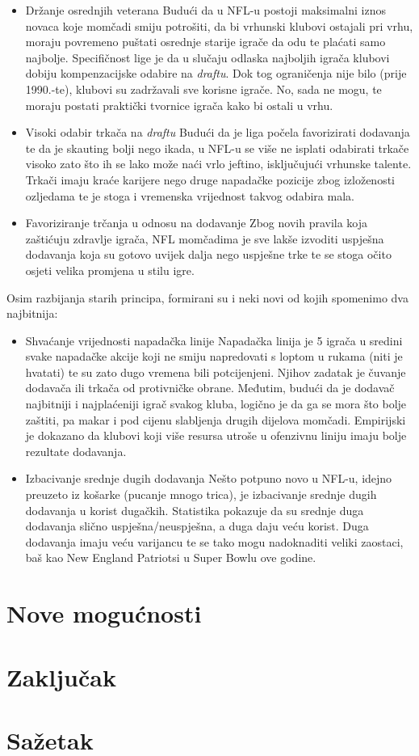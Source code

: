 \documentclass{ferseminar}
\begin{document}
\begin{itemize}
	\item Držanje osrednjih veterana \cite{ringer_age}
	\newline
	Budući da u NFL-u postoji maksimalni iznos novaca koje momčadi smiju potrošiti, da bi vrhunski klubovi ostajali pri vrhu, moraju povremeno puštati osrednje starije igrače da odu te plaćati samo najbolje. Specifičnost lige je da u slučaju odlaska najboljih igrača klubovi dobiju kompenzacijske odabire na \textit{draftu}. Dok tog ograničenja nije bilo (prije 1990.-te), klubovi su zadržavali sve korisne igrače. No, sada ne mogu, te moraju postati praktički tvornice igrača kako bi ostali u vrhu.
	\item Visoki odabir trkača na \textit{draftu} \cite{RBs}
	\newline
	Budući da je liga počela favorizirati dodavanja te da je skauting bolji nego ikada, u NFL-u se više ne isplati odabirati trkače visoko zato što ih se lako može naći vrlo jeftino, isključujući vrhunske talente. Trkači imaju kraće karijere nego druge napadačke pozicije zbog izloženosti ozljedama te je stoga i vremenska vrijednost takvog odabira mala. \cite{RBs2}
	\item Favoriziranje trčanja u odnosu na dodavanje
	\newline
	Zbog novih pravila koja zaštićuju zdravlje igrača, NFL momčadima je sve lakše izvoditi uspješna dodavanja koja su gotovo uvijek dalja nego uspješne trke te se stoga očito osjeti velika promjena u stilu igre. \cite{RBs}
\end{itemize}
Osim razbijanja starih principa, formirani su i neki novi od kojih spomenimo dva najbitnija:
\begin{itemize}
	\item Shvaćanje vrijednosti napadačka linije
	\newline
	Napadačka linija je 5 igrača u sredini svake napadačke akcije koji ne smiju napredovati s loptom u rukama (niti je hvatati) te su zato dugo vremena bili potcijenjeni. Njihov zadatak je čuvanje dodavača ili trkača od protivničke obrane. Međutim, budući da je dodavač najbitniji i najplaćeniji igrač svakog kluba, logično je da ga se mora što bolje zaštiti, pa makar i pod cijenu slabljenja drugih dijelova momčadi. Empirijski je dokazano da klubovi koji više resursa utroše u ofenzivnu liniju imaju bolje rezultate dodavanja. \cite{OL}
	\item Izbacivanje srednje dugih dodavanja \cite{Deep}
	\newline
	Nešto potpuno novo u NFL-u, idejno preuzeto iz košarke (pucanje mnogo trica), je izbacivanje srednje dugih dodavanja u korist dugačkih. Statistika pokazuje da su srednje duga dodavanja slično uspješna/neuspješna, a duga daju veću korist. Duga dodavanja imaju veću varijancu te se tako mogu nadoknaditi veliki zaostaci, baš kao New England Patriotsi u Super Bowlu ove godine. \cite{NEP}
\end{itemize}

\section{Nove mogućnosti}
\section{Zaključak}
\section{Sažetak}
\end{document}
